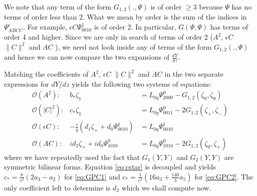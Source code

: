 We note that any term of the form $G_{1,2}\left( . , \Psi\right)$ is of order $\ge 3$ because $\Psi$ has no terms of order
less than 2. What we mean by order is the sum of the indices in $\Psi_{ABC\bar{C}}^\epsilon$. For example, $ \epsilon C \Psi_{0010}^1$ is of order 2. In particular, $G(\Psi, \Psi)$ has terms of order 4 and higher. Since we are only in search of
terms of order 2 ($A^2$, $\epsilon C$ $\|C\|^2$ and $AC$ ), we need not look inside any of terms of the form $G_{1,2}\left( . , \Psi\right)$  and hence we can now compare the two expansions of $\frac{dY}{dz}$.

Matching the coefficients of  $A^2$, $\epsilon C$ $\|C\|^2$ and
$AC$ in the two separate expressions for $dY/dz$ yields the
following two systems of equations:
\begin{subequations}
\begin{eqnarray}
\mathcal{O}(A^2): &		b_* \zeta_1 &= L_{0q} \Psi_{2000}^0 - G_{1,2}(\zeta_0,\zeta_0) \\
\mathcal{O}(\left|C\right|^2):&	c_* \zeta_1 &= L_{0q} \Psi_{0011}^0 -2 G_{1,2}(\zeta_+,\zeta_-) \label{eq:cstar} \\
\mathcal{O}(\epsilon C): &-\frac{i}{q} \left(d_1 \zeta_+ +  d_0 \Psi_{0010}^1\right) &= L_{0q} \Psi_{0010}^1 \\
\mathcal{O}(A C): 	&i d_2 \zeta_+ + i d_0 \Psi_{1010}^0 &= L_{0q} \Psi_{1010}^0 - 2 G_{1,2}(\zeta_0,\zeta_+)  \label{eq:AC}
\end{eqnarray}
\end{subequations}
where we have repeatedly used the fact that $G_1(Y,Y)$ and $G_2(Y,Y)$ are symmetric bilinear forms. Equation \eqref{eq:cstar} is decoupled and yields 
$ c_* = \frac{8}{c^2}\left( 2 a_3 - a_2 \right)$ for \eqref{eq:GPC1}
and 
$ c_* = \frac{1}{c^2}\left( 16 a_3 + \frac{140}{3} a_5 \right) $
for \eqref{eq:GPC2}.  The only coefficient left to determine is $d_2$ which we shall compute now. 


